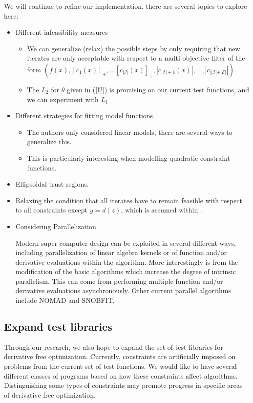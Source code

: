 \documentclass{article}
\let\oldref\ref
\renewcommand{\ref}[1]{(\oldref{#1})}
\begin{document}
We will continue to refine our implementation, there are several topics to explore here:
\begin{itemize}
\item Different infeasibility measures
	\begin{itemize}
		\item We can generalize (relax) the possible steps by only requiring that new iterates are only acceptable with respect to a multi objective filter of the form $(f(x), [c_1(x)]_+, \ldots [c_{|\mathcal I|}(x)]_+, |c_{|\mathcal I| + 1}(x)|, \ldots, |c_{||\mathcal I| + |\mathcal E|}|)$.
		\item The $L_2$ for $\theta$ given in \ref{l2} is promising on our current test functions, and we can experiment with $L_1$
	\end{itemize}	
	
\item Different strategies for fitting model functions.
	\begin{itemize}
		\item The authors only considered linear models, there are several ways to generalize this.
		\item This is particularly interesting when modelling quadratic constraint functions.
	\end{itemize}	

\item Ellipsoidal trust regions.
	
\item Relaxing the condition that all iterates have to remain feasible with respect to all constraints except $y = d(z)$, which is assumed within \cite{DUMMY:Brekelman}.

\item Considering Parallelization

Modern super computer design can be exploited in several different ways, including parallelization of linear algebra kernels or of function and/or derivative evaluations within the algorithm.
More interestingly is from the modification of the basic algorithms which increase the degree of intrinsic parallelism.
This can come from performing multiple function and/or derivative evaluations asynchronously.
Other current parallel algorithms include NOMAD and SNOBFIT.
\end{itemize}




\subsection{Expand test libraries}
Through our research, we also hope to expand the set of test libraries for derivative free optimization.
Currently, constraints are artificially imposed on problems from the current set of test functions.
We would like to have several different classes of programs based on how these constraints affect algorithms.
Distinguishing some types of constraints may promote progress in specific areas of derivative free optimization.
\end{document}
